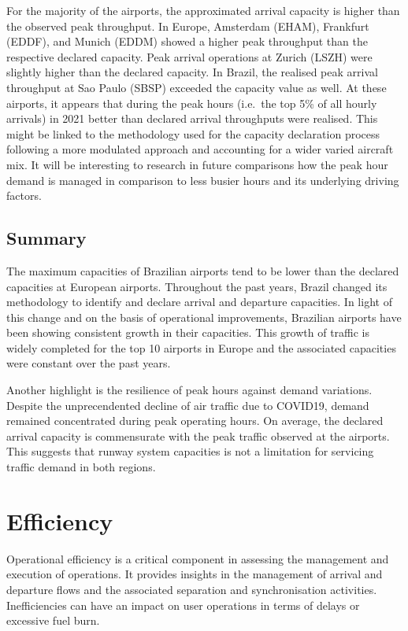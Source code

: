 \documentclass[
  a4paper,
  DIV=11,
  numbers=noendperiod]{scrreprt}
\begin{document}
For the majority of the airports, the approximated arrival capacity is
higher than the observed peak throughput. In Europe, Amsterdam (EHAM),
Frankfurt (EDDF), and Munich (EDDM) showed a higher peak throughput than
the respective declared capacity. Peak arrival operations at Zurich
(LSZH) were slightly higher than the declared capacity. In Brazil, the
realised peak arrival throughput at Sao Paulo (SBSP) exceeded the
capacity value as well. At these airports, it appears that during the
peak hours (i.e.~the top 5\% of all hourly arrivals) in 2021 better than
declared arrival throughputs were realised. This might be linked to the
methodology used for the capacity declaration process following a more
modulated approach and accounting for a wider varied aircraft mix. It
will be interesting to research in future comparisons how the peak hour
demand is managed in comparison to less busier hours and its underlying
driving factors.

\hypertarget{summary-3}{%
\section{Summary}\label{summary-3}}

The maximum capacities of Brazilian airports tend to be lower than the
declared capacities at European airports. Throughout the past years,
Brazil changed its methodology to identify and declare arrival and
departure capacities. In light of this change and on the basis of
operational improvements, Brazilian airports have been showing
consistent growth in their capacities. This growth of traffic is widely
completed for the top 10 airports in Europe and the associated
capacities were constant over the past years.

Another highlight is the resilience of peak hours against demand
variations. Despite the unprecendented decline of air traffic due to
COVID19, demand remained concentrated during peak operating hours. On
average, the declared arrival capacity is commensurate with the peak
traffic observed at the airports. This suggests that runway system
capacities is not a limitation for servicing traffic demand in both
regions.


\hypertarget{efficiency}{%
\chapter{Efficiency}\label{efficiency}}

Operational efficiency is a critical component in assessing the
management and execution of operations. It provides insights in the
management of arrival and departure flows and the associated separation
and synchronisation activities. Inefficiencies can have an impact on
user operations in terms of delays or excessive fuel burn.
\end{document}
